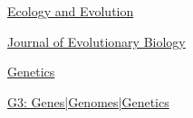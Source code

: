 

\begin{cvpeerreview}

    \vspace{-10mm}
  \cvpeerreviewentry
    {\href{https://onlinelibrary.wiley.com/journal/20457758}{Ecology and Evolution}} %
    \vspace{-2mm}

  \cvpeerreviewentry
    {\href{https://onlinelibrary.wiley.com/journal/14209101}{Journal of Evolutionary Biology}}

  \columnbreak

  \cvpeerreviewentry
    {\href{https://academic.oup.com/genetics}{Genetics}} %

  \cvpeerreviewentry
    {\href{https://academic.oup.com/g3journal}{G3: Genes|Genomes|Genetics}} %


\vspace{-10mm}

\end{cvpeerreview}
